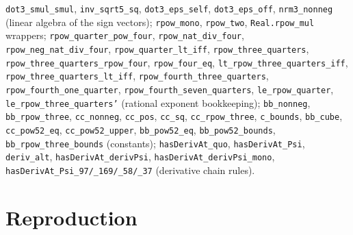 \documentclass[11pt]{article}
\newcommand{\Ln}[1]{\texttt{#1}}
\begin{document}
\Ln{dot3\_\allowbreak{}smul\_\allowbreak{}smul}, \Ln{inv\_\allowbreak{}sqrt5\_\allowbreak{}sq}, \Ln{dot3\_\allowbreak{}eps\_\allowbreak{}self}, \Ln{dot3\_\allowbreak{}eps\_\allowbreak{}off},
\Ln{nrm3\_\allowbreak{}nonneg} (linear algebra of the sign vectors); \Ln{rpow\_\allowbreak{}mono}, \Ln{rpow\_\allowbreak{}two},
\Ln{Real.rpow\_\allowbreak{}mul} wrappers; \Ln{rpow\_\allowbreak{}quarter\_\allowbreak{}pow\_\allowbreak{}four}, \Ln{rpow\_\allowbreak{}nat\_\allowbreak{}div\_\allowbreak{}four},
\Ln{rpow\_\allowbreak{}neg\_\allowbreak{}nat\_\allowbreak{}div\_\allowbreak{}four}, \Ln{rpow\_\allowbreak{}quarter\_\allowbreak{}lt\_\allowbreak{}iff}, \Ln{rpow\_\allowbreak{}three\_\allowbreak{}quarters},
\Ln{rpow\_\allowbreak{}three\_\allowbreak{}quarters\_\allowbreak{}rpow\_\allowbreak{}four}, \Ln{rpow\_\allowbreak{}four\_\allowbreak{}eq},
\Ln{lt\_\allowbreak{}rpow\_\allowbreak{}three\_\allowbreak{}quarters\_\allowbreak{}iff}, \Ln{rpow\_\allowbreak{}three\_\allowbreak{}quarters\_\allowbreak{}lt\_\allowbreak{}iff},
\Ln{rpow\_\allowbreak{}fourth\_\allowbreak{}three\_\allowbreak{}quarters}, \Ln{rpow\_\allowbreak{}fourth\_\allowbreak{}one\_\allowbreak{}quarter},
\Ln{rpow\_\allowbreak{}fourth\_\allowbreak{}seven\_\allowbreak{}quarters}, \Ln{le\_\allowbreak{}rpow\_\allowbreak{}quarter},
\Ln{le\_\allowbreak{}rpow\_\allowbreak{}three\_\allowbreak{}quarters'} (rational exponent bookkeeping);
\Ln{bb\_\allowbreak{}nonneg}, \Ln{bb\_\allowbreak{}rpow\_\allowbreak{}three}, \Ln{cc\_\allowbreak{}nonneg}, \Ln{cc\_\allowbreak{}pos}, \Ln{cc\_\allowbreak{}sq},
\Ln{cc\_\allowbreak{}rpow\_\allowbreak{}three}, \Ln{c\_\allowbreak{}bounds}, \Ln{bb\_\allowbreak{}cube}, \Ln{cc\_\allowbreak{}pow52\_\allowbreak{}eq},
\Ln{cc\_\allowbreak{}pow52\_\allowbreak{}upper}, \Ln{bb\_\allowbreak{}pow52\_\allowbreak{}eq}, \Ln{bb\_\allowbreak{}pow52\_\allowbreak{}bounds},
\Ln{bb\_\allowbreak{}rpow\_\allowbreak{}three\_\allowbreak{}bounds} (constants); \Ln{hasDerivAt\_\allowbreak{}quo}, \Ln{hasDerivAt\_\allowbreak{}Psi},
\Ln{deriv\_\allowbreak{}alt}, \Ln{hasDerivAt\_\allowbreak{}derivPsi}, \Ln{hasDerivAt\_\allowbreak{}derivPsi\_\allowbreak{}mono},
\Ln{hasDerivAt\_\allowbreak{}Psi\_\allowbreak{}97/\_\allowbreak{}169/\_\allowbreak{}58/\_\allowbreak{}37} (derivative chain rules).

\section{Reproduction}
\end{document}

